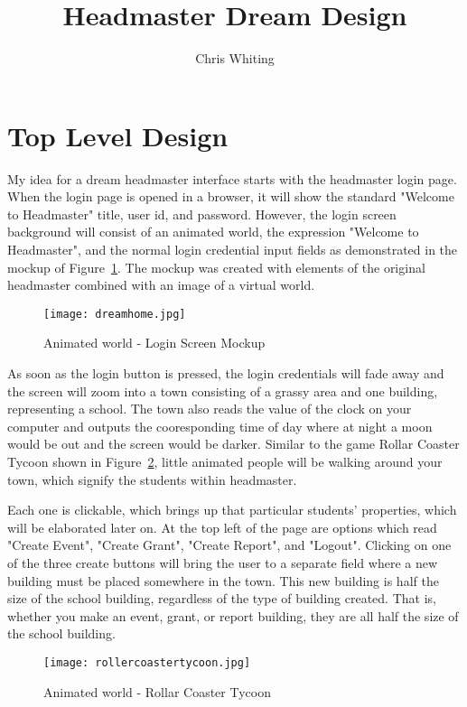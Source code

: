 \documentclass[11pt]{article}
\title{Headmaster Dream Design}
\author{Chris Whiting}
\begin{document}
\maketitle

 
\section{Top Level Design}
My idea for a dream headmaster interface starts with the headmaster login page. When the login page is opened in a browser, it will show the standard "Welcome to Headmaster" title, user id, and password. However, the login screen background will consist of an animated world, the expression "Welcome to Headmaster", and the normal login credential input fields as demonstrated in the mockup of Figure~\ref{homepage}. The mockup was created with elements of the original headmaster combined with an image of a virtual world.

\begin{figure}[h]
\centering
\texttt{[image: dreamhome.jpg]}
\caption{Animated world - Login Screen Mockup}
\label{homepage}
\end{figure}

As soon as the login button is pressed, the login credentials will fade away and the screen will zoom into a town consisting of a grassy area and one building, representing a school. The town also reads the value of the clock on your computer and outputs the cooresponding time of day where at night a moon would be out and the screen would be darker. Similar to the game Rollar Coaster Tycoon shown in Figure~\ref{RCT}, little animated people will be walking around your town, which signify the students within headmaster.

 Each one is clickable, which brings up that particular students' properties, which will be elaborated later on. At the top left of the page are options which read "Create Event", "Create Grant", "Create Report", and "Logout". Clicking on one of the three create buttons will bring the user to a separate field where a new building must be placed somewhere in the town. This new building is half the size of the school building, regardless of the type of building created. That is, whether you make an event, grant, or report building, they are all half the size of the school building. 

\begin{figure}[h]
\centering
\texttt{[image: rollercoastertycoon.jpg]}
\caption{Animated world - Rollar Coaster Tycoon}
\label{RCT}
\end{figure}
\end{document}
